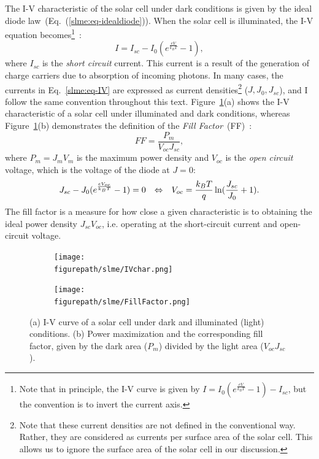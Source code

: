 \begin{refsection}
The I-V characteristic of the solar cell under dark conditions is given by the 
ideal diode law~(Eq.~(\ref{slme:eq-idealdiode})). When the solar cell is 
illuminated, the I-V equation becomes\footnote{Note that in principle, the I-V 
curve is given by $I = I_0 (e^\frac{e V}{k_B T} - 1) - I_{sc}$, but the 
convention is to invert the current axis.}~\cite{Lindholm1979}: 
\begin{equation}\label{slme:eq-IV} 
I = I_{sc} - I_0 (e^\frac{e V}{k_B T} - 1), 
\end{equation} 
where $I_{sc}$ is the \textit{short circuit} current. This current is a result 
of the generation of charge carriers due to absorption of incoming photons. In 
many cases, the currents in Eq.~\ref{slme:eq-IV} are expressed as current 
densities\footnote{Note that these current densities are not defined in the 
conventional way. Rather, they are considered as currents per surface area of 
the solar cell. This allows us to ignore the surface area of the solar cell in 
our discussion.} ($J,J_0,J_{sc}$), and I follow the same convention 
throughout this text. Figure~\ref{slme:fig-IV_char}(a) shows the I-V 
characteristic of a solar cell under illuminated and dark conditions, whereas 
Figure~\ref{slme:fig-IV_char}(b) demonstrates the definition of the 
\textit{Fill Factor}~(FF)~\cite{Fonash2010}: 
\begin{equation} 
FF = \frac{P_{m}}{V_{oc} J_{sc}}, 
\end{equation} 
where $P_m = J_m V_m$ is the maximum power density and $V_{oc}$ is the 
\textit{open circuit} voltage, which is the voltage of the diode at $J = 0$: 
\begin{equation} 
J_{sc} - J_0 (e^\frac{eV_{oc}}{k_B T}-1) = 0 \hspace{0.1in} \Leftrightarrow 
\hspace{0.1in} V_{oc} = \frac{k_B T}{q} \ln (\frac{J_{sc}}{J_0} + 1). 
\end{equation} 
The fill factor is a measure for how close a given characteristic is to 
obtaining the ideal power density $J_{sc}V_{oc}$, i.e. operating at the 
short-circuit current and open-circuit voltage. 
 
\begin{figure}[ht]  
\centering 
\captionsetup{width=0.9\textwidth} 
\begin{subfigure}{0.5\textwidth} 
\centering 
\texttt{[image: \\figurepath/slme/IVchar.png]} 
\caption{} 
\end{subfigure}%
\begin{subfigure}{0.5\textwidth} 
\centering 
\texttt{[image: \\figurepath/slme/FillFactor.png]} 
\caption{} 
\end{subfigure} 
\caption{\label{slme:fig-IV_char} (a) I-V curve of a solar cell under dark and 
illuminated (light) conditions. (b) Power maximization and the corresponding 
fill factor, given by the dark area ($P_m$) divided by the light area ($V_{oc} 
J_{sc}$).} 
\end{figure} 


\end{refsection}
